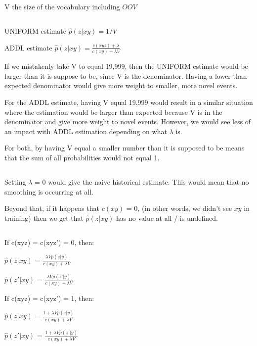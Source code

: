 \documentclass[12pt, letterpaper]{article}
\begin{document}
V the size of the vocabulary including $OOV$

\subsection{}

UNIFORM estimate $\hat{p}(z | xy) = 1 / V$

ADDL estimate $\hat{p}(z | xy) = \frac{c(xyz) + \lambda}{c(xy) + \lambda V}$

If we mistakenly take V to equal 19,999, then the UNIFORM estimate would be larger than it is suppose to be, since V is the denominator. Having a lower-than-expected denominator would give more weight to smaller, more novel events.

For the ADDL estimate, having V equal 19,999 would result in a similar situation where the estimation would be larger than expected because V is in the denominator and give more weight to novel events. However, we would see less of an impact with ADDL estimation depending on what $\lambda$ is. 

For both, by having V equal a smaller number than it is supposed to be means that the sum of all probabilities would not equal 1. 

\subsection{}

Setting $\lambda$ = 0 would give the naive historical estimate. This would mean that no smoothing is occurring at all. 

Beyond that, if it happens that $c(xy)$ = 0, (in other words, we didn't see $xy$ in training) then we get that $\hat{p}(z|xy)$ has no value at all / is undefined.

\subsection{}

If c(xyz) = c(xyz') = 0, then:

$\hat{p}(z|xy)$ = $\frac{\lambda V \hat{p}(z|y)}{c(xy) + \lambda V}$

$\hat{p}(z'|xy)$ = $\frac{\lambda V \hat{p}(z'|y)}{c(xy) + \lambda V}$

If c(xyz) = c(xyz') = 1, then:

$\hat{p}(z|xy)$ = $\frac{1 + \lambda V \hat{p}(z|y)}{c(xy) + \lambda V}$

$\hat{p}(z'|xy)$ = $\frac{1 + \lambda V \hat{p}(z'|y)}{c(xy) + \lambda V}$
\end{document}

